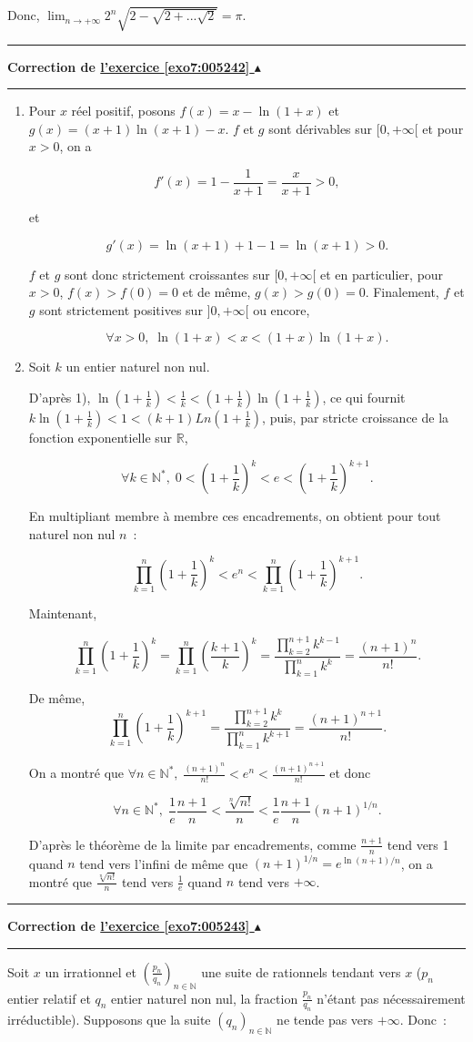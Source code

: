 \documentclass[11pt,a4paper]{article}
\newcommand{\Nn}{\mathbb{N}} \newcommand{\N}{\mathbb{N}}
\newcommand{\Rr}{\mathbb{R}} \newcommand{\R}{\mathbb{R}}
\newcounter{exo}
\newcommand{\correction}[1]{\hypertarget{cor7:#1}{}\label{cor7:#1}{\bf Correction de \hyperlink{exo7:#1}{l'exercice \ref{exo7:#1} $\blacktriangle$}}\vspace{1mm}\hrule\vspace{1mm}}
\newcommand{\fincorrection}{\vspace{1mm}\hrule\vspace*{7mm}}
\begin{document}
Donc, $\lim_{n\rightarrow +\infty}2^n\sqrt{2-\sqrt{2+...\sqrt{2}}}=\pi$.
\fincorrection
\correction{005242}
\begin{enumerate}
\item  Pour $x$ réel positif, posons $f(x)=x-\ln(1+x)$ et $g(x)=(x+1)\ln(x+1)-x$.
$f$ et $g$ sont dérivables sur $[0,+\infty[$ et pour $x>0$, on a

$$f'(x)=1-\frac{1}{x+1}=\frac{x}{x+1}>0,$$

et

$$g'(x)=\ln(x+1)+1-1=\ln(x+1)>0.$$

$f$ et $g$ sont donc strictement croissantes sur $[0,+\infty[$ et en particulier, pour $x>0$, $f(x)>f(0)=0$ et de même, $g(x)>g(0)=0$. Finalement, $f$ et $g$ sont strictement positives sur $]0,+\infty[$ ou encore,

$$\forall x>0,\;\ln(1+x)<x<(1+x)\ln(1+x).$$

\item  Soit $k$ un entier naturel non nul.

D'après 1), $\ln(1+\frac{1}{k})<\frac{1}{k}<(1+\frac{1}{k})\ln(1+\frac{1}{k})$, ce qui fournit $k\ln(1+\frac{1}{k})<1<(k+1)Ln(1+\frac{1}{k})$, puis, par stricte croissance de la fonction exponentielle sur $\Rr$, 

$$\forall k\in\Nn^*,\;0<(1+\frac{1}{k})^k<e<(1+\frac{1}{k})^{k+1}.$$

En multipliant membre à membre ces encadrements, on obtient pour tout naturel non nul $n$~:

$$\prod_{k=1}^{n}(1+\frac{1}{k})^k<e^n<\prod_{k=1}^{n}(1+\frac{1}{k})^{k+1}.$$

Maintenant, 

$$\prod_{k=1}^{n}(1+\frac{1}{k})^k=\prod_{k=1}^{n}\left(\frac{k+1}{k}\right)^k=\frac{\prod_{k=2}^{n+1}k^{k-1}}{\prod_{k=1}^{n}k^k}=\frac{(n+1)^n}{n!}.$$

De même,
$$\prod_{k=1}^{n}(1+\frac{1}{k})^{k+1}=\frac{\prod_{k=2}^{n+1}k^{k}}{\prod_{k=1}^{n}k^{k+1}}=\frac{(n+1)^{n+1}}{n!}.$$

On a montré que $\forall n\in\Nn^*,\;\frac{(n+1)^n}{n!}<e^n<\frac{(n+1)^{n+1}}{n!}$ et donc 
 
$$\forall n\in\Nn^*,\;\frac{1}{e}\frac{n+1}{n}<\frac{\sqrt[n]{n!}}{n}<\frac{1}{e}\frac{n+1}{n}(n+1)^{1/n}.$$  

D'après le théorème de la limite par encadrements, comme $\frac{n+1}{n}$ tend vers 1 quand $n$ tend vers l'infini de même que $(n+1)^{1/n}=e^{\ln(n+1)/n}$, on a montré que $\frac{\sqrt[n]{n!}}{n}$ tend vers $\frac{1}{e}$ quand $n$ tend vers $+\infty$. 
\end{enumerate}
\fincorrection
\correction{005243}
Soit $x$ un irrationnel et $(\frac{p_n}{q_n})_{n\in\Nn}$ une suite de rationnels tendant vers $x$ ($p_n$ entier relatif et $q_n$ entier naturel non nul, la fraction $\frac{p_n}{q_n}$ n'étant pas nécessairement irréductible). Supposons que la suite $(q_n)_{n\in\Nn}$ ne tende pas vers $+\infty$. Donc~:
\end{document}
